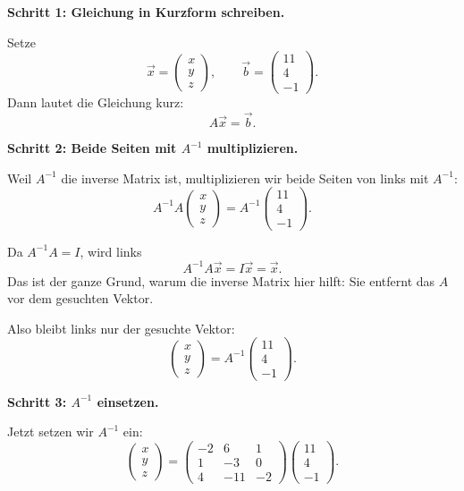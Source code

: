 \documentclass[a4paper,12pt]{article}
\begin{document}
\textbf{Schritt 1: Gleichung in Kurzform schreiben.}

Setze
\[
\vec{x}=
\begin{pmatrix}
x\\y\\z
\end{pmatrix},
\qquad
\vec{b}=
\begin{pmatrix}
11\\4\\-1
\end{pmatrix}.
\]
Dann lautet die Gleichung kurz:
\[
A\vec{x}=\vec{b}.
\]

\textbf{Schritt 2: Beide Seiten mit $A^{-1}$ multiplizieren.}

Weil $A^{-1}$ die inverse Matrix ist, multiplizieren wir beide Seiten von links mit $A^{-1}$:
\[
A^{-1}A
\begin{pmatrix}
x\\y\\z
\end{pmatrix}
=
A^{-1}
\begin{pmatrix}
11\\4\\-1
\end{pmatrix}.
\]

Da $A^{-1}A=I$, wird links
\[
A^{-1}A\vec{x}=I\vec{x}=\vec{x}.
\]
Das ist der ganze Grund, warum die inverse Matrix hier hilft:
Sie entfernt das $A$ vor dem gesuchten Vektor.

Also bleibt links nur der gesuchte Vektor:
\[
\begin{pmatrix}
x\\y\\z
\end{pmatrix}
=
A^{-1}
\begin{pmatrix}
11\\4\\-1
\end{pmatrix}.
\]

\textbf{Schritt 3: $A^{-1}$ einsetzen.}

Jetzt setzen wir $A^{-1}$ ein:
\[
\begin{pmatrix}
x\\y\\z
\end{pmatrix}
=
\begin{pmatrix}
-2 & 6 & 1 \\
1 & -3 & 0 \\
4 & -11 & -2
\end{pmatrix}
\begin{pmatrix}
11\\4\\-1
\end{pmatrix}.
\]
\end{document}
